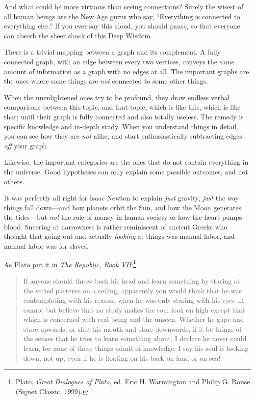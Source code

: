 {
 And what could be more virtuous than seeing connections? Surely
the wisest of all human beings are the New Age gurus who say,
``Everything is connected to everything
else.'' If you ever say this aloud, you should pause,
so that everyone can absorb the sheer shock of this Deep Wisdom.}

{
 There is a trivial mapping between a graph and its complement. A
fully connected graph, with an edge between every two vertices, conveys
the same amount of information as a graph with no edges at all. The
important graphs are the ones where some things are \textit{not}
connected to some other things.}

{
 When the unenlightened ones try to be profound, they draw endless
verbal comparisons between this topic, and that topic, which is like
this, which is like that; until their graph is fully connected and also
totally useless. The remedy is specific knowledge and in-depth study.
When you understand things in detail, you can see how they are
\textit{not} alike, and start enthusiastically subtracting edges
\textit{off} your graph.}

{
 Likewise, the important categories are the ones that do not
contain everything in the universe. Good hypotheses can only explain
some possible outcomes, and not others.}

{
 It was perfectly all right for Isaac Newton to explain
\textit{just} gravity, \textit{just} the way things fall down---and how
planets orbit the Sun, and how the Moon generates the tides---but
\textit{not} the role of money in human society or how the heart pumps
blood. Sneering at narrowness is rather reminiscent of ancient Greeks
who thought that going out and actually \textit{looking} at things was
manual labor, and manual labor was for slaves.}

{
 As Plato put it in \textit{The Republic, Book
VII}:\footnote{Plato, \textit{Great Dialogues of Plato}, ed. Eric H.
Warmington and Philip G. Rouse (Signet Classic, 1999).}}

\begin{quote}
{
 If anyone should throw back his head and learn something by
staring at the varied patterns on a ceiling, apparently you would think
that he was contemplating with his reason, when he was only staring
with his eyes \ldots I cannot but believe that no study makes the soul
look on high except that which is concerned with real being and the
unseen. Whether he gape and stare upwards, or shut his mouth and stare
downwards, if it be things of the senses that he tries to learn
something about, I declare he never could learn, for none of these
things admit of knowledge: I say his soul is looking down, not up, even
if he is floating on his back on land or on sea!}
\end{quote}

